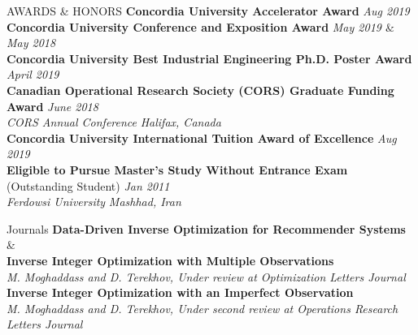 \documentclass{resume} %
\begin{document}
\begin{rSection}{AWARDS \& HONORS}
{\bf Concordia University Accelerator Award } \hfill {\em Aug 2019} \\ 
{\bf Concordia University Conference and Exposition Award} \hfill {\em May 2019 $\&$  May 2018} \\ 
{\bf Concordia University Best Industrial Engineering Ph.D. Poster Award} \hfill {\em April 2019} \\  
{\bf  Canadian Operational Research Society (CORS) Graduate Funding Award} \hfill {\em June 2018} \\ 
 \textit{CORS Annual Conference} \hfill {\em Halifax, Canada}\\
{\bf  Concordia University International Tuition Award of Excellence} \hfill {\em Aug 2019} \\ 
{\bf Eligible to Pursue Master's Study Without Entrance Exam} (Outstanding Student) \hfill {\em  Jan 2011} \\ 
\textit{Ferdowsi University} \hfill {\em Mashhad, Iran}
\end{rSection} 
\begin{rSection}{Journals}
  {\bf Data-Driven Inverse Optimization for Recommender Systems} \& \\ 
   {\bf   Inverse Integer Optimization with Multiple Observations} \\ 
  \textit{M. Moghaddass and D. Terekhov, Under review at Optimization Letters Journal}  \\
 {\bf  Inverse Integer Optimization with an Imperfect  Observation}  \\ 
 \textit{M. Moghaddass and D. Terekhov, Under second review at Operations Research Letters Journal}  
\end{rSection}
\end{document}
